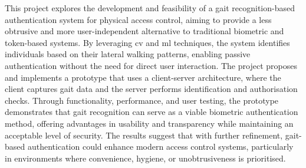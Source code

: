 This project explores the development and feasibility of a gait recognition-based authentication system for physical access control, aiming to provide a less obtrusive and more user-independent alternative to traditional biometric and token-based systems.
By leveraging \ac{cv} and \ac{ml} techniques, the system identifies individuals based on their lateral walking patterns, enabling passive authentication without the need for direct user interaction.
The project proposes and implements a prototype that uses a client-server architecture, where the client captures gait data and the server performs identification and authorisation checks.
Through functionality, performance, and user testing, the prototype demonstrates that gait recognition can serve as a viable biometric authentication method, offering advantages in usability and transparency while maintaining an acceptable level of security.
The results suggest that with further refinement, gait-based authentication could enhance modern access control systems, particularly in environments where convenience, hygiene, or unobtrusiveness is prioritised.